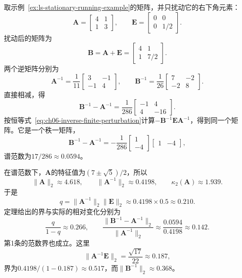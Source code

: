 \begin{example}[一次系数扰动]
\label{ex:ls-inverse-perturbation-numeric}
取示例~\ref{ex:ls-stationary-running-example}的矩阵，并只扰动它的右下角元素：
\[
 \bm A=\begin{bmatrix}4&1\\1&3\end{bmatrix},\qquad
 \bm E=\begin{bmatrix}0&0\\0&1/2\end{bmatrix}.
\]
扰动后的矩阵为
\[
 \bm B=\bm A+\bm E=\begin{bmatrix}4&1\\1&7/2\end{bmatrix}.
\]
两个逆矩阵分别为
\[
 \bm A^{-1}=\frac1{11}\begin{bmatrix}3&-1\\-1&4\end{bmatrix},\qquad
 \bm B^{-1}=\frac1{26}\begin{bmatrix}7&-2\\-2&8\end{bmatrix}.
\]
直接相减，得
\[
 \bm B^{-1}-\bm A^{-1}=\frac1{286}\begin{bmatrix}-1&4\\4&-16\end{bmatrix}.
\]
按恒等式~\eqref{eq:ch06-inverse-finite-perturbation}计算$-\bm B^{-1}\bm E\bm A^{-1}$，得到同一个矩阵。它是一个秩一矩阵，
\[
 \bm B^{-1}-\bm A^{-1}=-\frac1{286}\begin{bmatrix}1\\-4\end{bmatrix}\begin{bmatrix}1&-4\end{bmatrix},
\]
谱范数为$17/286\approx0.0594$。

在谱范数下，$\bm A$的特征值为$(7\pm\sqrt5)/2$，所以
\[
 \lVert\bm A\rVert_2\approx4.618,\qquad \lVert\bm A^{-1}\rVert_2\approx0.4198,\qquad \kappa_2(\bm A)\approx1.939 .
\]
于是
\[
 q=\lVert\bm A^{-1}\rVert_2\lVert\bm E\rVert_2\approx0.4198\times0.5\approx0.210 .
\]
定理给出的界与实际的相对变化分别为
\[
 \frac{q}{1-q}\approx0.266,\qquad
 \frac{\lVert\bm B^{-1}-\bm A^{-1}\rVert_2}{\lVert\bm A^{-1}\rVert_2}\approx\frac{0.0594}{0.4198}\approx0.142 .
\]
第1条的范数界也成立。这里
\[
 \lVert\bm A^{-1}\bm E\rVert_2=\frac{\sqrt{17}}{22}\approx0.187,
\]
界为$0.4198/(1-0.187)\approx0.517$，而$\lVert\bm B^{-1}\rVert_2\approx0.368$。
\end{example}

